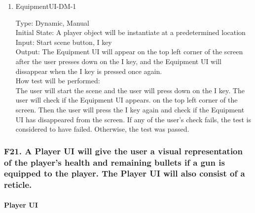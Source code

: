 \documentclass[12pt, titlepage]{article}
\newcounter{ftnum}
\begin{document}
\begin{enumerate}

\item{{\color{magenta} EquipmentUI-DM-1}\\}  \label{F20-1}

{\color{magenta} Type: Dynamic, Manual }  \\
					
{\color{magenta} Initial State: A player object will be instantiate at a predetermined location}\\
					
{\color{magenta} Input: Start scene button,  I key}\\
					
{\color{magenta} Output: The Equipment UI will appear on the top left corner of the screen after the user presses down on the I key, and the Equipment UI will dissappear when the I key is pressed once again. }\\
					
{\color{magenta} How test will be performed:}\\  {\color{magenta} The user will start the scene and the user will press down on the I key. The user will check if the Equipment UI appears. on the top left corner of the screen. Then the user will press the I key again and check if the Equipment UI has disappeared from the screen. If any of the user's check fails, the test is considered to have failed. Otherwise, the test was passed.}\\

\end{enumerate}

\subsubsection{{\color{magenta} F21. A Player UI will give the user a visual representation of the player's health and remaining bullets if a gun is equipped to the player. The Player UI will also consist of a reticle.}} 

\paragraph{{\color{magenta} Player UI}}
\end{document}
